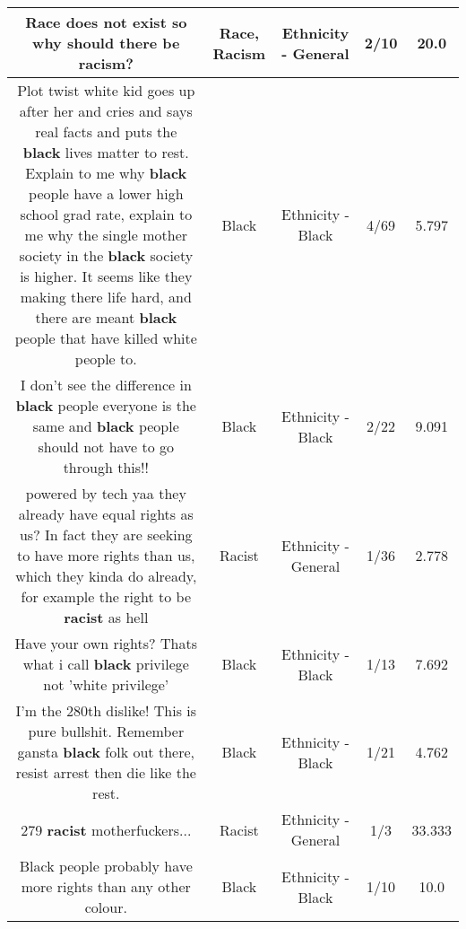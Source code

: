 \documentclass[11pt]{article}
\newlength\mylength
\begin{document}
\begin{center}
\begin{longtable}{|C{.65\mylength}|C{.30\mylength}|C{.12\mylength}|C{.12\mylength}|C{.12\mylength}|}
  \small Race does not exist so why should there be \textbf{racism}?\normalsize   & Race, Racism & Ethnicity - General & 2/10 & 20.0 \\  \hline
  \small Plot twist white kid goes up after her and cries and says real facts and puts the \textbf{black} lives matter to rest. Explain to me why \textbf{black} people have a lower high school grad rate, explain to me why the single mother society in the \textbf{black} society is higher. It seems like they making there life hard, and there are meant \textbf{black} people that have killed white people to.\normalsize   & Black & Ethnicity - Black & 4/69 & 5.797 \\  \hline
  \small I don't see the difference in \textbf{black} people everyone is the same and \textbf{black} people should not have to go through this!!\normalsize   & Black & Ethnicity - Black & 2/22 & 9.091 \\  \hline
  \small powered by tech yaa they already have equal rights as us? In fact they are seeking to have more rights than us, which they kinda do already, for example the right to be \textbf{racist} as hell\normalsize   & Racist & Ethnicity - General & 1/36 & 2.778 \\  \hline
  \small Have your own rights? Thats what i call \textbf{black} privilege not 'white privilege'\normalsize   & Black & Ethnicity - Black & 1/13 & 7.692 \\  \hline
  \small I'm the 280th dislike! This is pure bullshit. Remember gansta \textbf{black} folk out there, resist arrest then die like the rest.\normalsize   & Black & Ethnicity - Black & 1/21 & 4.762 \\  \hline
  \small 279 \textbf{racist} motherfuckers...\normalsize   & Racist & Ethnicity - General & 1/3 & 33.333 \\  \hline
  \small Black people probably have more rights than any other colour.\normalsize   & Black & Ethnicity - Black & 1/10 & 10.0 \\  \hline

\end{longtable}
\end{center}
\end{document}
